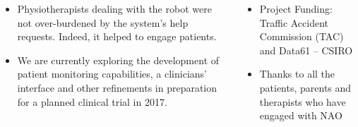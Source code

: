 \documentclass[a0paper, portrait]{tikzposter}
\begin{document}
\begin{columns}
 {
    \begin{itemize}
        \item Physiotherapists dealing with the robot were not over-burdened by the system's help requests. Indeed, it helped to engage patients.
        \item We are currently exploring the development of patient monitoring capabilities, a clinicians' interface and other refinements in preparation for
        a planned clinical trial in 2017.
    \end{itemize}
 }
 {
    \begin{itemize}
        \item Project Funding: Traffic Accident Commission (TAC) and Data61 -- CSIRO
        \item Thanks to all the patients, parents and therapists who have engaged with NAO
    \end{itemize}
 }
\end{columns}
\end{document}
